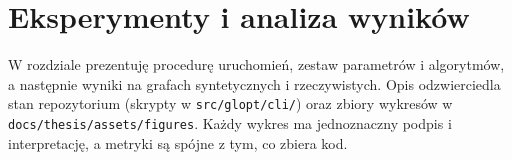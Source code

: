 \chapter{Eksperymenty i analiza wyników}

W rozdziale prezentuję procedurę uruchomień, zestaw parametrów i algorytmów, a następnie wyniki na grafach syntetycznych i rzeczywistych. Opis odzwierciedla stan repozytorium (skrypty w \texttt{src/glopt/cli/}) oraz zbiory wykresów w \texttt{docs/thesis/assets/figures}. Każdy wykres ma jednoznaczny podpis i interpretację, a metryki są spójne z tym, co zbiera kod.




